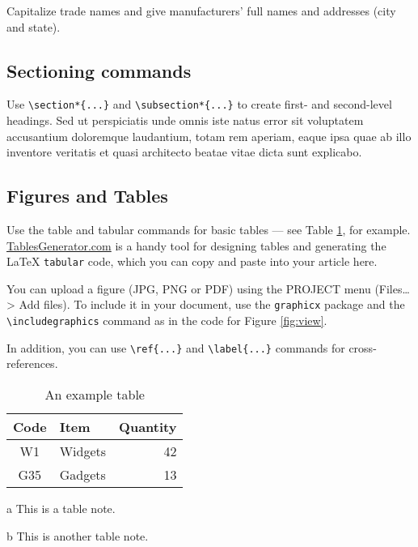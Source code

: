 \documentclass{biophys-new}
\begin{document}
Capitalize trade names and give manufacturers' full names and addresses (city and state). 


\subsection*{Sectioning commands}

Use \verb|\section*{...}| and \verb|\subsection*{...}| to create first- and second-level headings. Sed ut perspiciatis unde omnis iste natus error sit voluptatem accusantium doloremque laudantium, totam rem aperiam, eaque ipsa quae ab illo inventore veritatis et quasi architecto beatae vitae dicta sunt explicabo. 

\subsection*{Figures and Tables}

Use the table and tabular commands for basic tables --- see Table \ref{tab:widgets}, for example. \href{http://tablesgenerator.com}{TablesGenerator.com} is a handy tool for designing tables and generating the \LaTeX{} \texttt{tabular} code, which you can copy and paste into your article here.

You can upload a figure (JPG, PNG or PDF) using the PROJECT menu (Files\ldots > Add files). To include it in your document, use the \verb|graphicx| package and the \verb|\includegraphics| command as in the code for Figure \ref{fig:view}. 

In addition, you can use \verb|\ref{...}| and \verb|\label{...}| commands for cross-references.

\begin{table}[hbt!]
\caption{An example table}
\label{tab:widgets}
\centering

\begin{threeparttable}

\begin{tabular}{c l r}
\hline
Code & Item & Quantity \\\hline
W1 & Widgets\tnote{a} & 42 \\
G35 & Gadgets & 13\tnote{b} \\
\hline
\end{tabular}

\begin{tablenotes}
\item[a] This is a table note.
\item[b] This is another table note.
\end{tablenotes}

\end{threeparttable}

\end{table}
\end{document}
